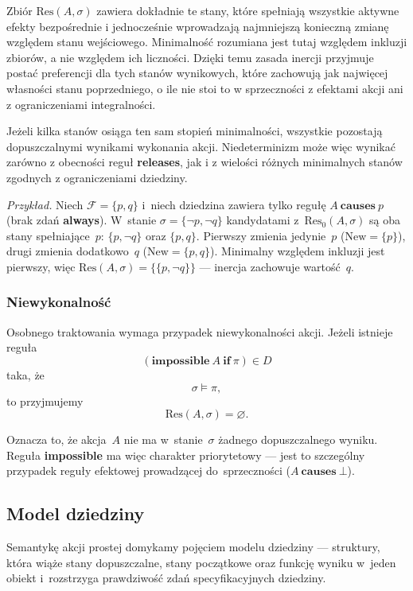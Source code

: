 \documentclass[11pt,a4paper]{article}
\newcommand{\causes}{\textbf{causes}}
\newcommand{\always}{\textbf{always}}
\theoremstyle{definition}
\begin{document}
Zbiór $\mathrm{Res}(A,\sigma)$ zawiera dokładnie te stany, które spełniają wszystkie aktywne efekty bezpośrednie i jednocześnie wprowadzają najmniejszą konieczną zmianę względem stanu wejściowego. Minimalność rozumiana jest tutaj względem inkluzji zbiorów, a nie względem ich liczności. Dzięki temu zasada inercji przyjmuje postać preferencji dla tych stanów wynikowych, które zachowują jak najwięcej własności stanu poprzedniego, o ile nie stoi to w sprzeczności z efektami akcji ani z ograniczeniami integralności.

Jeżeli kilka stanów osiąga ten sam stopień minimalności, wszystkie pozostają dopuszczalnymi wynikami wykonania akcji. Niedeterminizm może więc wynikać zarówno z obecności reguł \textbf{releases}, jak i z wielości różnych minimalnych stanów zgodnych z ograniczeniami dziedziny.

\smallskip\noindent\emph{Przykład.}
Niech $\mathcal{F}=\{p,q\}$ i~niech dziedzina zawiera tylko regułę $A\ \causes\ p$
(brak zdań \always{}). W~stanie $\sigma=\{\neg p,\neg q\}$ kandydatami z~$\mathrm{Res}_0(A,\sigma)$
są oba stany spełniające~$p$: $\{p,\neg q\}$ oraz $\{p,q\}$. Pierwszy zmienia jedynie~$p$
($\mathrm{New}=\{p\}$), drugi zmienia dodatkowo~$q$ ($\mathrm{New}=\{p,q\}$). Minimalny
względem inkluzji jest pierwszy, więc $\mathrm{Res}(A,\sigma)=\{\{p,\neg q\}\}$ ---
inercja zachowuje wartość~$q$.

\subsubsection{Niewykonalność}

Osobnego traktowania wymaga przypadek niewykonalności akcji. Jeżeli istnieje reguła
\[
(\textbf{impossible}\ A\ \textbf{if}\ \pi)\in D
\]
taka, że
\[
\sigma \models \pi,
\]
to przyjmujemy
\[
\mathrm{Res}(A,\sigma)=\varnothing.
\]

Oznacza to, że akcja~$A$ nie ma w~stanie~$\sigma$ żadnego dopuszczalnego wyniku. Reguła \textbf{impossible} ma więc charakter priorytetowy --- jest to szczególny przypadek reguły efektowej prowadzącej do~sprzeczności ($A\ \causes\ \bot$).

\subsection{Model dziedziny}
\label{sec:model-jezyk-akcji}

Semantykę akcji prostej domykamy pojęciem modelu dziedziny --- struktury, która wiąże stany dopuszczalne, stany początkowe oraz funkcję wyniku w~jeden obiekt i~rozstrzyga prawdziwość zdań specyfikacyjnych dziedziny.
\end{document}

